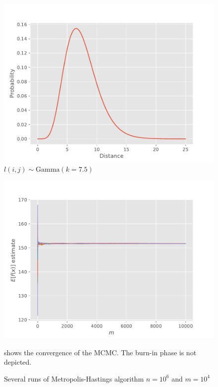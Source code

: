 \documentclass[6pt,oneside]{article}
\begin{document}
\begin{figure}[h]
    \center
    \caption{$l(i,j) \sim \mathrm{Gamma}(k=7.5)$}
    \includegraphics[scale=0.8]{../src/fig1.pdf}
\end{figure}


\begin{figure}[h]
    \center
    \caption{Several runs of Metropolis-Hastings algorithm $n=10^{6}$ and $m=10^{4}$}
    \includegraphics[scale=0.8]{../src/fig2.pdf}
    \footnotesize
    \vspace{10pt}

     shows the convergence of the MCMC. The burn-in phase is not depicted.
\end{figure}
\end{document}
